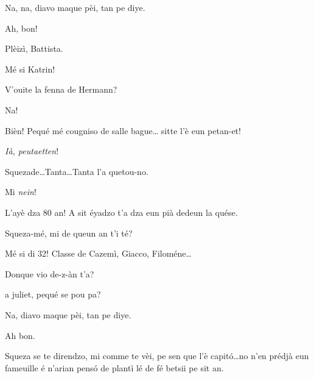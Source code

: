 \begin{drama}
\Battistaspeaks{}  Na, na, diavo maque pèi, tan pe diye.

\Hermannspeaks Ah, bon!


\Battistaspeaks{} Plèizì, Battista.

\Katrinspeaks{} Mé si Katrin!

\Battistaspeaks  V'ouite la fenna de Hermann?

\Katrinspeaks  Na!

\Battistaspeaks  Bièn! Pequé mé cougniso de salle bague\ldots {} sitte l’è eun petan-et!

\Peterspeaks{} \textit{Ià, peutaetten}!

\scene[-- R.I.P. Tanta]


\Cesarspeaks{} Squezade\ldots Tanta\ldots Tanta l’a quetou-no.

\Hermannspeaks Mi \textit{nein}!


\Battistaspeaks{}  L’ayè dza 80 an! A sit éyadzo t’a dza eun pià dedeun la quése.


\Hermannspeaks{} Squeza-mé, mi de queun an t'i té?

\Battistaspeaks Mé si di 32! Classe de Cazemì, Giacco, Filoméne\ldots

\Hermannspeaks Donque vio de-z-àn t’a?

 a juliet, pequé se pou pa?

\Hermannspeaks Na, diavo maque pèi, tan pe diye.

\Battistaspeaks Ah bon.

\Cesarspeaks{} Squeza se te direndzo, mi comme te vèi, pe sen que l'è capit\'o\ldots no n'en prédjà eun fameuille é n'arian pens\'o de plantì lé de fé betsii pe sit an.



\end{drama}
